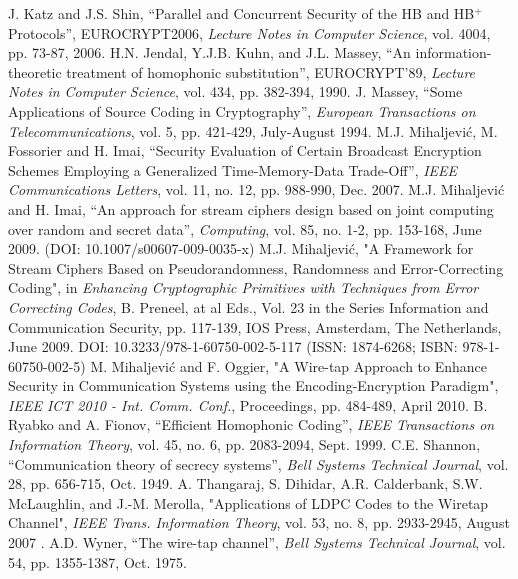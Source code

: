 \documentclass{article}[11pt]
\begin{document}
\begin{thebibliography}{99}
J. Katz and J.S. Shin, ``Parallel and Concurrent Security of the
HB and HB$^+$ Protocols'', EUROCRYPT2006, {\em Lecture Notes in
Computer Science}, vol. 4004, pp. 73-87, 2006.
H.N. Jendal, Y.J.B. Kuhn, and J.L. Massey, ``An
information-theoretic treatment of homophonic substitution'',
EUROCRYPT'89,  {\em Lecture Notes in Computer Science}, vol. 434,
pp. 382-394, 1990.
J. Massey, ``Some Applications of Source Coding in Cryptography'',
{\em European Transactions on Telecommunications}, vol. 5, pp.
421-429, July-August 1994.
 M.J. Mihaljevi\'{c}, M. Fossorier and
H. Imai, ``Security Evaluation of Certain Broadcast Encryption Schemes
Employing a Generalized Time-Memory-Data Trade-Off'', {\em IEEE Communications
Letters}, vol. 11, no. 12, pp. 988-990, Dec. 2007.
M.J. Mihaljevi\'{c} and H. Imai, ``An approach for stream ciphers
design based on joint computing over random and secret data'',
{\em Computing}, vol. 85, no. 1-2, pp. 153-168, June 2009. (DOI:
10.1007/s00607-009-0035-x)
M.J. Mihaljevi\'{c}, "A Framework for Stream Ciphers Based on
Pseudorandomness, Randomness and Error-Correcting Coding", in
{\em Enhancing Cryptographic Primitives with Techniques from Error
Correcting Codes}, B. Preneel, at al Eds.,  Vol. 23 in the Series
Information and Communication Security, pp. 117-139,
IOS Press, Amsterdam, The Netherlands, June 2009. DOI:
10.3233/978-1-60750-002-5-117 (ISSN: 1874-6268; ISBN:
978-1-60750-002-5)
M. Mihaljevi\'{c} and F. Oggier, "A Wire-tap Approach to Enhance
Security in Communication Systems using the Encoding-Encryption
Paradigm", {\em IEEE ICT 2010 - Int. Comm. Conf.}, Proceedings,
pp. 484-489, April 2010.
B. Ryabko and A. Fionov, ``Efficient Homophonic Coding'', {\em
IEEE Transactions on Information Theory}, vol. 45, no. 6, pp.
2083-2094, Sept. 1999.
C.E. Shannon, ``Communication theory of secrecy systems'', {\em
Bell Systems Technical Journal}, vol. 28, pp. 656-715, Oct. 1949.
A. Thangaraj, S. Dihidar, A.R. Calderbank, S.W. McLaughlin, and
J.-M. Merolla, "Applications of LDPC Codes to the Wiretap
Channel", {\em IEEE Trans. Information Theory}, vol. 53, no. 8,
pp. 2933-2945, August 2007 .
 A.D. Wyner, ``The wire-tap channel'',
{\em Bell Systems Technical Journal}, vol. 54, pp. 1355-1387, Oct.
1975.
\end{thebibliography}
\end{document}
